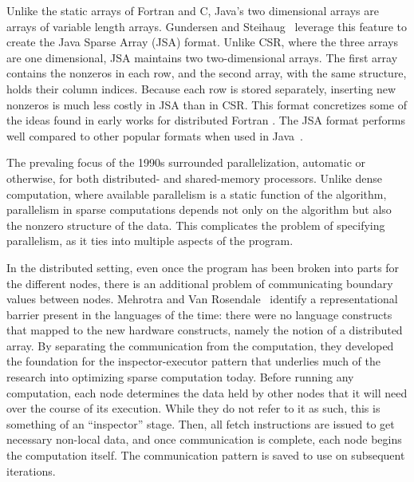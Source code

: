 Unlike the static arrays of Fortran and C, Java's two dimensional arrays are arrays of variable length arrays. 
Gundersen and Steihaug~\cite{gundersen2004data} leverage this feature to create the Java Sparse Array (JSA) format.
Unlike CSR, where the three arrays are one dimensional, JSA maintains two two-dimensional arrays. 
The first array contains the nonzeros in each row, and the second array, with the same structure, holds their column indices. 
Because each row is stored separately, inserting new nonzeros is much less costly in JSA than in CSR. 
This format concretizes some of the ideas found in early works for distributed Fortran .
The JSA format performs well compared to other popular formats when used in Java~\cite{lujan2005storage}.


\cite{ashcraft1999spooles}


\cite{irwin1997aspect}





The prevaling focus of the 1990s surrounded parallelization, automatic or otherwise, for both distributed- and shared-memory processors.
Unlike dense computation, where available parallelism is a static function of the algorithm, parallelism in sparse computations depends not only on the algorithm but also the nonzero structure of the data.
This complicates the problem of specifying parallelism, as it ties into multiple aspects of the program.

In the distributed setting, even once the program has been broken into parts for the different nodes, there is an additional problem of communicating boundary values between nodes.
Mehrotra and Van Rosendale~\cite{mehrotra1989compiling} identify a representational barrier present in the languages of the time: there were no language constructs that mapped to the new hardware constructs, namely the notion of a distributed array.
By separating the communication from the computation, they developed the foundation for the inspector-executor pattern that underlies much of the research into optimizing sparse computation today.
Before running any computation, each node determines the data held by other nodes that it will need over the course of its execution.
While they do not refer to it as such, this is something of an \enquote{inspector} stage.
Then, all fetch instructions are issued to get necessary non-local data, and once communication is complete, each node begins the computation itself.
The communication pattern is saved to use on subsequent iterations.


